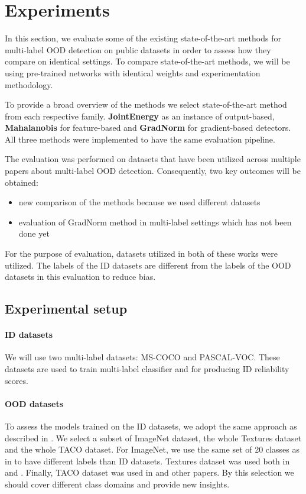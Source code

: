 \section{Experiments}
In this section, we evaluate some of the existing state-of-the-art methods for multi-label OOD detection
 on public datasets in order to assess how they compare on identical settings. 
 To compare state-of-the-art methods, we will be using pre-trained networks with identical weights and experimentation methodology.

To provide a broad overview of the methods we select state-of-the-art method from each respective family.
\textbf{JointEnergy} as an instance of output-based, \textbf{Mahalanobis} for feature-based and \textbf{GradNorm} for gradient-based detectors.
All three methods were implemented to have the same evaluation pipeline. 

The evaluation was performed on datasets that have been utilized across multiple papers about multi-label OOD detection. 
Consequently, two key outcomes will be obtained:
\begin{itemize}
    \itemsep0em 
    \item new comparison of the methods because we used different datasets
    \item evaluation of GradNorm method in multi-label settings which has not been done yet
\end{itemize}
For the purpose of evaluation, datasets utilized in both of these works were utilized. 
The labels of the ID datasets are different from the labels of the OOD datasets in this evaluation to reduce bias.

\subsection{Experimental setup}
\paragraph{ID datasets}
We will use two multi-label datasets: MS-COCO\cite{linMicrosoftCOCOCommon2015} and PASCAL-VOC\cite{everinghamPascalVisualObject2015}. 
These datasets are used to train multi-label classifier and for producing ID reliability scores. 

\paragraph{OOD datasets}
To assess the models trained on the ID datasets, we adopt the same approach as described in \cite{Wang2021}. 
We select a subset of ImageNet\cite{dengImageNetLargescaleHierarchical2009} dataset, the whole Textures\cite{cimpoiDescribingTexturesWild2013} dataset and the whole TACO\cite{proencaTACOTrashAnnotations2020} dataset.
For ImageNet, we use the same set of 20 classes as in \cite{Wang2021} to have different labels than ID datasets.
Textures dataset was used both in \cite{Wang2021} and \cite{huangImportanceGradientsDetecting2021}.
Finally, TACO dataset was used in \cite{Zolfi2022} and other papers.
By this selection we should cover different class domains and provide new insights.

